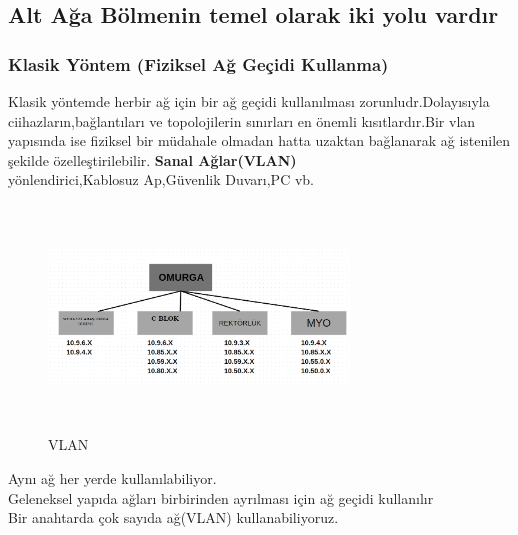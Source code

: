 \subsection*{Alt Ağa Bölmenin temel olarak iki yolu vardır}
\subsubsection*{Klasik Yöntem (Fiziksel Ağ Geçidi Kullanma)}
Klasik yöntemde herbir ağ için bir ağ geçidi kullanılması zorunludr.Dolayısıyla ciihazların,bağlantıları ve topolojilerin sınırları en önemli kısıtlardır.Bir vlan yapısında ise fiziksel bir müdahale olmadan hatta uzaktan bağlanarak ağ istenilen şekilde özelleştirilebilir.
\textbf{Sanal Ağlar(VLAN)}\\
yönlendirici,Kablosuz Ap,Güvenlik Duvarı,PC vb.

\begin{figure}[ht]
    \centering
    \includegraphics[width=8cm,height=6cm]{images/Soru3}
    \caption{VLAN}
    \label{fig:vlan_ornegi}
\end{figure}

Aynı ağ her yerde kullanılabiliyor.\\
Geleneksel yapıda ağları birbirinden ayrılması için ağ geçidi kullanılır\\
Bir anahtarda çok sayıda ağ(VLAN) kullanabiliyoruz.

